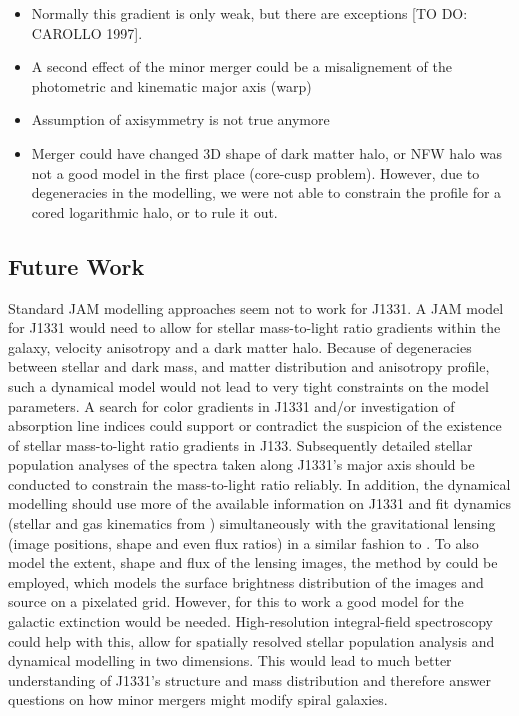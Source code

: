 \begin{itemize}
\item Normally this gradient is only weak, but there are exceptions [TO DO: CAROLLO 1997].
\item A second effect of the minor merger could be a misalignement of the photometric and kinematic major axis (warp)
\item Assumption of axisymmetry is not true anymore
\item Merger could have changed 3D shape of dark matter halo, or NFW halo was not a good model in the first place (core-cusp problem). However, due to degeneracies in the modelling, we were not able to constrain the profile for a cored logarithmic halo, or to rule it out. 
\end{itemize}

\subsection{Future Work}

Standard JAM modelling approaches seem not to work for J1331. A JAM model for J1331 would need to allow for stellar mass-to-light ratio gradients within the galaxy, velocity anisotropy and a dark matter halo. Because of degeneracies between stellar and dark mass, and matter distribution and anisotropy profile, such a dynamical model would not lead to very tight constraints on the model parameters.  A search for color gradients in J1331 and/or investigation of absorption line indices could support or contradict the suspicion of the existence of stellar mass-to-light ratio gradients in J133. Subsequently detailed stellar population analyses of the spectra taken along J1331's major axis should be conducted to constrain the mass-to-light ratio reliably. In addition, the dynamical modelling should use more of the available information on J1331 and fit dynamics (stellar and gas kinematics from \citet{SWELLSV}) simultaneously with the gravitational lensing (image positions, shape and even flux ratios) in a similar fashion to \citet{SWELLSIV}. To also model the extent, shape and flux of the lensing images, the method by \citet{2004ApJ...611..739T,2003ApJ...590..673W} could be employed, which models the surface brightness distribution of the images and source on a pixelated grid. However, for this to work a good model for the galactic extinction would be needed. High-resolution integral-field spectroscopy could help with this, allow for spatially resolved stellar population analysis and dynamical modelling in two dimensions. This would lead to much better understanding of J1331's structure and mass distribution and therefore answer questions on how minor mergers might modify spiral galaxies.